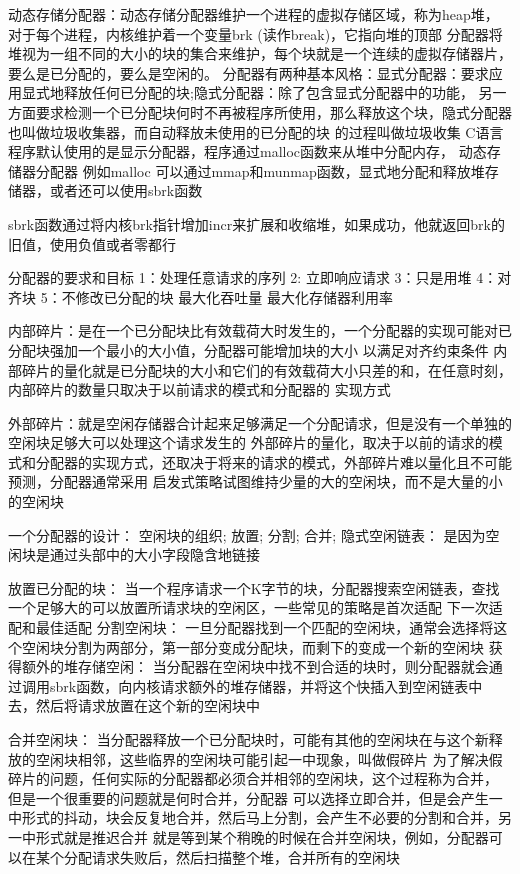 \documentclass[11pt, a4paper]{article}
\begin{document}
动态存储分配器：动态存储分配器维护一个进程的虚拟存储区域，称为heap堆，对于每个进程，内核维护着一个变量brk
(读作break)，它指向堆的顶部
分配器将堆视为一组不同的大小的块的集合来维护，每个块就是一个连续的虚拟存储器片，要么是已分配的，要么是空闲的。
分配器有两种基本风格：显式分配器：要求应用显式地释放任何已分配的块;隐式分配器：除了包含显式分配器中的功能，
另一方面要求检测一个已分配块何时不再被程序所使用，那么释放这个块，隐式分配器也叫做垃圾收集器，而自动释放未使用的已分配的块
的过程叫做垃圾收集
C语言程序默认使用的是显示分配器，程序通过malloc函数来从堆中分配内存，
动态存储器分配器 例如malloc 可以通过mmap和munmap函数，显式地分配和释放堆存储器，或者还可以使用sbrk函数

sbrk函数通过将内核brk指针增加incr来扩展和收缩堆，如果成功，他就返回brk的旧值，使用负值或者零都行

分配器的要求和目标
1：处理任意请求的序列
2: 立即响应请求
3：只是用堆
4：对齐块
5：不修改已分配的块
最大化吞吐量
最大化存储器利用率

内部碎片：是在一个已分配块比有效载荷大时发生的，一个分配器的实现可能对已分配块强加一个最小的大小值，分配器可能增加块的大小
以满足对齐约束条件
内部碎片的量化就是已分配块的大小和它们的有效载荷大小只差的和，在任意时刻，内部碎片的数量只取决于以前请求的模式和分配器的
实现方式

外部碎片：就是空闲存储器合计起来足够满足一个分配请求，但是没有一个单独的空闲块足够大可以处理这个请求发生的
外部碎片的量化，取决于以前的请求的模式和分配器的实现方式，还取决于将来的请求的模式，外部碎片难以量化且不可能预测，分配器通常采用
启发式策略试图维持少量的大的空闲块，而不是大量的小的空闲块

一个分配器的设计：
	空闲块的组织;
	放置;
	分割;
	合并;
隐式空闲链表：
	是因为空闲块是通过头部中的大小字段隐含地链接

放置已分配的块：
	当一个程序请求一个K字节的块，分配器搜索空闲链表，查找一个足够大的可以放置所请求块的空闲区，一些常见的策略是首次适配
	下一次适配和最佳适配
分割空闲块：
	一旦分配器找到一个匹配的空闲块，通常会选择将这个空闲块分割为两部分，第一部分变成分配块，而剩下的变成一个新的空闲块
获得额外的堆存储空闲：
	当分配器在空闲块中找不到合适的块时，则分配器就会通过调用sbrk函数，向内核请求额外的堆存储器，并将这个快插入到空闲链表中
	去，然后将请求放置在这个新的空闲块中

合并空闲块：
	当分配器释放一个已分配块时，可能有其他的空闲块在与这个新释放的空闲块相邻，这些临界的空闲块可能引起一中现象，叫做假碎片
	为了解决假碎片的问题，任何实际的分配器都必须合并相邻的空闲块，这个过程称为合并， 但是一个很重要的问题就是何时合并，分配器
	可以选择立即合并，但是会产生一中形式的抖动，块会反复地合并，然后马上分割，会产生不必要的分割和合并，另一中形式就是推迟合并
	就是等到某个稍晚的时候在合并空闲块，例如，分配器可以在某个分配请求失败后，然后扫描整个堆，合并所有的空闲块
\end{document}
